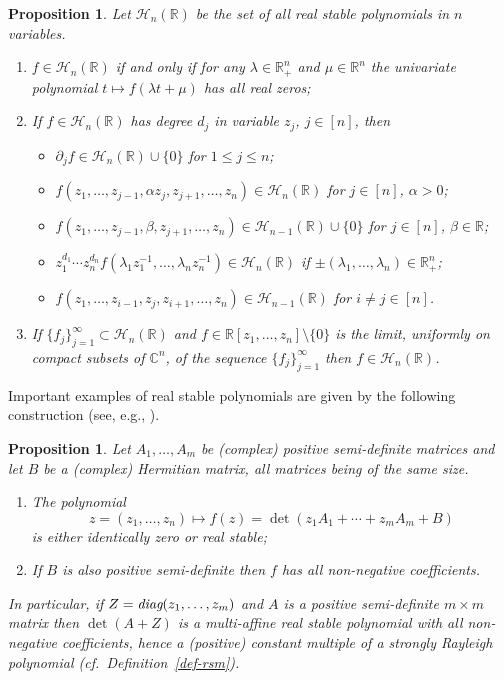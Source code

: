 \documentclass[10pt,reqno]{amsart}
\theoremstyle{plain}
\newtheorem{proposition}[theorem]{Proposition}
\theoremstyle{definition}
\theoremstyle{remark}
\newcommand{\HH}{\mathcal{H}}
\newcommand{\RR}{\mathbb{R}}
\newcommand{\CC}{\mathbb{C}}
\begin{document}
\begin{proposition}\label{pro-rs}
Let $\HH_n(\RR)$ be the set of all real stable polynomials in $n$
variables. 
\begin{enumerate}
\item $f\in \HH_n(\RR)$ if and only if for any $\lambda\in\RR_+^n$ and 
$\mu\in\RR^n$ the univariate polynomial $t\mapsto f(\lambda t+\mu)$ has all 
real zeros;
\item  If $f\in\HH_n(\RR)$ has degree $d_j$ in variable $z_j$, $j\in [n]$,
then
\begin{itemize}
\item $\partial_j f \in \HH_n(\RR)\cup\{0\}$ for 
$1 \leq j \leq n$;
\item $f(z_1, \ldots, z_{j-1}, \alpha z_j, z_{j+1}, \ldots, z_n) 
\in \HH_{n}(\RR)$ for $j \in [n]$, $\alpha > 0$;
\item $f(z_1, \ldots, z_{j-1},\beta, z_{j+1}, \ldots, z_n) 
\in \HH_{n-1}(\RR)\cup\{0\}$ for $j \in [n]$, $\beta\in \RR$;
\item $z_1^{d_1}\cdots z_n^{d_n}
f(\lambda_1 z_1^{-1},\ldots,\lambda_n z_n^{-1})\in\HH_n(\RR)$ if 
$\pm (\lambda_1,\ldots,\lambda_n)\in\RR_+^n$;
\item $f(z_1,\ldots, z_{i-1}, z_j, z_{i+1}, \ldots, z_n) \in \HH_{n-1}(\RR)$ 
for 
$i\neq j \in [n]$.
\end{itemize}
\item If $\{f_j\}_{j=1}^\infty \subset \HH_n(\RR)$ and 
$f \in \RR[z_1,\ldots, z_n]\setminus \{0\}$ is the limit, uniformly on 
compact subsets of $\CC^n$, of the sequence $\{f_j\}_{j=1}^\infty$ then 
$f \in \HH_n(\RR)$. 
\end{enumerate}
\end{proposition}

Important examples of real stable 
polynomials are given by the following construction 
(see, e.g., \cite{BBS1,BBS2}).

\begin{proposition}\label{det-pen}
Let $A_1,\ldots, A_m$ be (complex) positive semi-definite matrices and let $B$
be a (complex) Hermitian matrix, all matrices being of the same size.
\begin{enumerate} 
\item The polynomial 
\begin{equation}\label{pencil}
z=(z_1,\ldots,z_n)\mapsto f(z)= \det(z_1A_1+\cdots +z_mA_m+B) 
\end{equation}
is either identically zero or real stable; 
\item If $B$ is also 
positive semi-definite then $f$ has all non-negative coefficients.
\end{enumerate}
In particular, if $Z=\text{{\em diag}}(z_1,\ldots,z_m)$ and $A$ is a positive 
semi-definite $m\times m$ matrix 
then $\det(A+Z)$ is a multi-affine real 
stable polynomial with all non-negative coefficients, hence a (positive)
constant multiple of a strongly 
Rayleigh polynomial (cf.~Definition~\ref{def-rsm}). 
\end{proposition}
\end{document}
